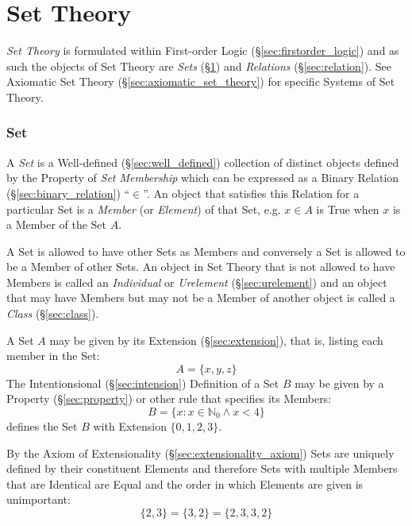 \part{Set Theory}\label{sec:set_theory}

\emph{Set Theory} is formulated within First-order Logic
(\S\ref{sec:firstorder_logic}) and as such the objects of Set Theory
are \emph{Sets} (\S\ref{sec:set}) and \emph{Relations}
(\S\ref{sec:relation}). See Axiomatic Set Theory
(\S\ref{sec:axiomatic_set_theory}) for specific Systems of Set Theory.



\section{Set}\label{sec:set}

A \emph{Set} is a Well-defined (\S\ref{sec:well_defined}) collection
of distinct objects defined by the Property of \emph{Set Membership}
which can be expressed as a Binary Relation
(\S\ref{sec:binary_relation}) ``$\in$''. An object that satisfies this
Relation for a particular Set is a \emph{Member} (or \emph{Element})
of that Set, e.g. $x \in A$ is True when $x$ is a Member of the Set
$A$.

A Set is allowed to have other Sets as Members and conversely a Set is
allowed to be a Member of other Sets. An object in Set Theory that is
not allowed to have Members is called an \emph{Individual} or
\emph{Urelement} (\S\ref{sec:urelement}) and an object that may have
Members but may not be a Member of another object is called a
\emph{Class} (\S\ref{sec:class}).

A Set $A$ may be given by its Extension (\S\ref{sec:extension}), that
is, listing each member in the Set:
\[
  A = \{x,y,z\}
\]
The Intentionsional (\S\ref{sec:intension}) Definition of a Set $B$
may be given by a Property (\S\ref{sec:property}) or other rule that
specifies its Members:
\[
  B = \{ x : x \in \mathbb{N}_0 \wedge x < 4 \}
\]
defines the Set $B$ with Extension $\{ 0, 1, 2, 3 \}$.

By the Axiom of Extensionality (\S\ref{sec:extensionality_axiom}) Sets
are uniquely defined by their constituent Elements and therefore Sets
with multiple Members that are Identical are Equal and the order in
which Elements are given is unimportant:
\[
  \{ 2, 3 \} = \{ 3, 2 \} = \{ 2, 3, 3, 2 \}
\]



